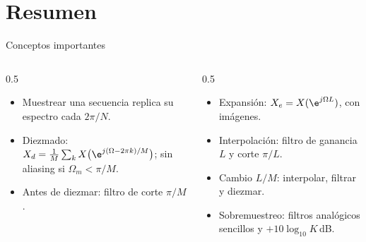 \documentclass[aspectratio=169,11pt]{beamer}
\begin{document}
\section*{Resumen}
\begin{frame}{Conceptos importantes}
  \begin{columns}[T]
    \begin{column}{0.5\textwidth}
      \begin{itemize}
        \item Muestrear una secuencia replica su espectro cada $2\pi/N$.
        \item Diezmado: $X_d=\frac1M\sum_kX\big(\e^{j(\Omega-2\pi k)/M}\big)$; sin aliasing si $\Omega_m<\pi/M$.
        \item Antes de diezmar: filtro de corte $\pi/M$.
      \end{itemize}
    \end{column}
    \begin{column}{0.5\textwidth}
      \begin{itemize}
        \item Expansión: $X_e=X(\e^{j\Omega L})$, con imágenes.
        \item Interpolación: filtro de ganancia $L$ y corte $\pi/L$.
        \item Cambio $L/M$: interpolar, filtrar y diezmar.
        \item Sobremuestreo: filtros analógicos sencillos y $+10\log_{10}K$\,dB.
      \end{itemize}
    \end{column}
  \end{columns}
  \bigskip
\end{frame}
\end{document}
